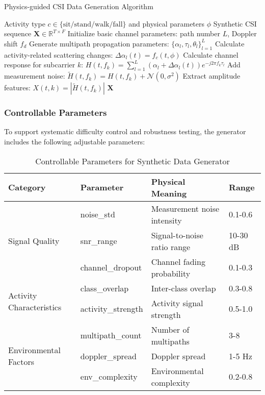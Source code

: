 \begin{algorithm}
\caption{Physics-guided CSI Data Generation Algorithm}
\label{alg:csi_generation}
\begin{algorithmic}[1]
\REQUIRE Activity type $c \in \{\text{sit/stand/walk/fall}\}$ and physical parameters $\phi$
\ENSURE Synthetic CSI sequence $\mathbf{X} \in \mathbb{R}^{T \times F}$
\STATE Initialize basic channel parameters: path number $L$, Doppler shift $f_d$
\STATE Generate multipath propagation parameters: $\{\alpha_l, \tau_l, \theta_l\}_{l=1}^L$
    \STATE Calculate activity-related scattering changes: $\Delta\alpha_l(t) = f_c(t, \phi)$
        \STATE Calculate channel response for subcarrier $k$:
        \STATE $H(t, f_k) = \sum_{l=1}^{L} (\alpha_l + \Delta\alpha_l(t)) e^{-j2\pi f_k \tau_l}$
    \ENDFOR
    \STATE Add measurement noise: $\tilde{H}(t, f_k) = H(t, f_k) + \mathcal{N}(0, \sigma^2)$
    \STATE Extract amplitude features: $X(t, k) = |\tilde{H}(t, f_k)|$
\ENDFOR
\RETURN $\mathbf{X}$
\end{algorithmic}
\end{algorithm}

\subsubsection{Controllable Parameters}
To support systematic difficulty control and robustness testing, the generator includes the following adjustable parameters:

\begin{table}[h]
\centering
\caption{Controllable Parameters for Synthetic Data Generator}
\label{tab:controllable_parameters}
\begin{tabular}{@{}llll@{}}
\toprule
Category & Parameter & Physical Meaning & Range \\
\midrule
\multirow{3}{*}{Signal Quality} & noise\_std & Measurement noise intensity & 0.1-0.6 \\
& snr\_range & Signal-to-noise ratio range & 10-30 dB \\
& channel\_dropout & Channel fading probability & 0.1-0.3 \\
\midrule
\multirow{2}{*}{Activity Characteristics} & class\_overlap & Inter-class overlap & 0.3-0.8 \\
& activity\_strength & Activity signal strength & 0.5-1.0 \\
\midrule
\multirow{3}{*}{Environmental Factors} & multipath\_count & Number of multipaths & 3-8 \\
& doppler\_spread & Doppler spread & 1-5 Hz \\
& env\_complexity & Environmental complexity & 0.2-0.8 \\
\bottomrule
\end{tabular}
\end{table}

